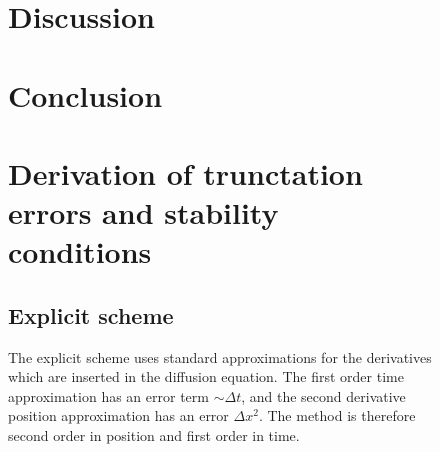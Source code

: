 \documentclass[aps,reprint]{revtex4-1}
\newcommand\blankpage{%
  \null
  \thispagestyle{empty}%
  \addtocounter{page}{-1}%
  \newpage}
\begin{document}
\begin{figure}[ht]
\section{Discussion} \label{sec:discussion}
\section{Conclusion} \label{sec:conclusion}

\blankpage
\appendix
\section{Derivation of trunctation errors and stability conditions} \label{sec:errors}
\subsection{Explicit scheme}
The explicit scheme uses standard approximations for the derivatives which are
inserted in the diffusion equation. The first order time approximation has
an error term $\sim \Delta{t}$, and the second derivative position approximation
has an error $\Delta{x^2}$. The method is therefore second order in position and
first order in time.


\end{figure}
\end{document}
